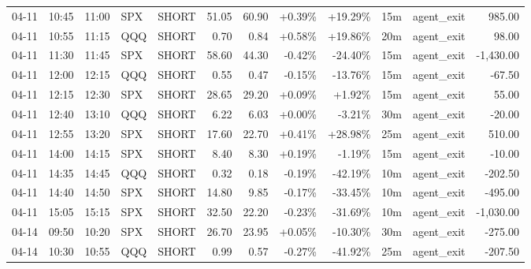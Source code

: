\documentclass[11pt,a4paper]{article}
\begin{document}
\begin{center}
\begin{longtable}{>{\color{txtmain}}l l l l l r r r r r >{\color{txtmain}}l r}
04-11 & 10:45 & 11:00 & SPX & SHORT & 51.05 & 60.90 & \textcolor{wingreen}{+0.39\%} & \textcolor{wingreen}{+19.29\%} & 15m & agent\_exit & \textcolor{wingreen}{985.00} \\
04-11 & 10:55 & 11:15 & QQQ & SHORT & 0.70 & 0.84 & \textcolor{wingreen}{+0.58\%} & \textcolor{wingreen}{+19.86\%} & 20m & agent\_exit & \textcolor{wingreen}{98.00} \\
04-11 & 11:30 & 11:45 & SPX & SHORT & 58.60 & 44.30 & \textcolor{lossred}{-0.42\%} & \textcolor{lossred}{-24.40\%} & 15m & agent\_exit & \textcolor{lossred}{-1,430.00} \\
04-11 & 12:00 & 12:15 & QQQ & SHORT & 0.55 & 0.47 & \textcolor{lossred}{-0.15\%} & \textcolor{lossred}{-13.76\%} & 15m & agent\_exit & \textcolor{lossred}{-67.50} \\
04-11 & 12:15 & 12:30 & SPX & SHORT & 28.65 & 29.20 & \textcolor{wingreen}{+0.09\%} & \textcolor{wingreen}{+1.92\%} & 15m & agent\_exit & \textcolor{wingreen}{55.00} \\
04-11 & 12:40 & 13:10 & QQQ & SHORT & 6.22 & 6.03 & \textcolor{wingreen}{+0.00\%} & \textcolor{lossred}{-3.21\%} & 30m & agent\_exit & \textcolor{lossred}{-20.00} \\
04-11 & 12:55 & 13:20 & SPX & SHORT & 17.60 & 22.70 & \textcolor{wingreen}{+0.41\%} & \textcolor{wingreen}{+28.98\%} & 25m & agent\_exit & \textcolor{wingreen}{510.00} \\
04-11 & 14:00 & 14:15 & SPX & SHORT & 8.40 & 8.30 & \textcolor{wingreen}{+0.19\%} & \textcolor{lossred}{-1.19\%} & 15m & agent\_exit & \textcolor{lossred}{-10.00} \\
04-11 & 14:35 & 14:45 & QQQ & SHORT & 0.32 & 0.18 & \textcolor{lossred}{-0.19\%} & \textcolor{lossred}{-42.19\%} & 10m & agent\_exit & \textcolor{lossred}{-202.50} \\
04-11 & 14:40 & 14:50 & SPX & SHORT & 14.80 & 9.85 & \textcolor{lossred}{-0.17\%} & \textcolor{lossred}{-33.45\%} & 10m & agent\_exit & \textcolor{lossred}{-495.00} \\
04-11 & 15:05 & 15:15 & SPX & SHORT & 32.50 & 22.20 & \textcolor{lossred}{-0.23\%} & \textcolor{lossred}{-31.69\%} & 10m & agent\_exit & \textcolor{lossred}{-1,030.00} \\
04-14 & 09:50 & 10:20 & SPX & SHORT & 26.70 & 23.95 & \textcolor{wingreen}{+0.05\%} & \textcolor{lossred}{-10.30\%} & 30m & agent\_exit & \textcolor{lossred}{-275.00} \\
04-14 & 10:30 & 10:55 & QQQ & SHORT & 0.99 & 0.57 & \textcolor{lossred}{-0.27\%} & \textcolor{lossred}{-41.92\%} & 25m & agent\_exit & \textcolor{lossred}{-207.50} \\

\end{longtable}
\end{center}
\end{document}
